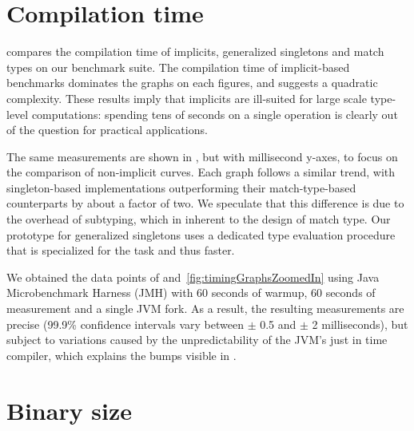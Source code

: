 \section{Compilation time}
\label{sec:compilation-time}


 compares the compilation time of implicits, generalized singletons and match types on our benchmark suite.
The compilation time of implicit-based benchmarks dominates the graphs on each figures, and suggests a quadratic complexity.
These results imply that implicits are ill-suited for large scale type-level computations: spending tens of seconds on a single operation is clearly out of the question for practical applications.


The same measurements are shown in , but with millisecond y-axes, to focus on the comparison of non-implicit curves.
Each graph follows a similar trend, with singleton-based implementations outperforming their match-type-based counterparts by about a factor of two.
We speculate that this difference is due to the overhead of subtyping, which in inherent to the design of match type.
Our prototype for generalized singletons uses a dedicated type evaluation procedure that is specialized for the task and thus faster.

We obtained the data points of  and~\ref{fig:timingGraphsZoomedIn} using Java Microbenchmark Harness (JMH) with 60 seconds of warmup, 60 seconds of measurement and a single JVM fork.
As a result, the resulting measurements are precise (99.9\% confidence intervals vary between $\pm$ 0.5 and $\pm$ 2 milliseconds), but subject to variations caused by the unpredictability of the JVM's just in time compiler, which explains the bumps visible in .

\section{Binary size}
\label{sec:binary-size}


